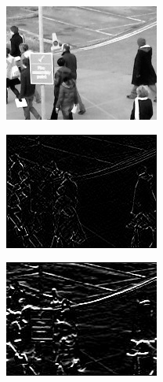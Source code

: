 \documentclass[times, utf8, zavrsni]{fer}
\begin{document}
\begin{multicols}{2}

\begin{minipage}{\linewidth}
\centering
\includegraphics[width=0.8\linewidth]{img/2982.jpg}
\end{minipage}

\begin{minipage}{\linewidth}
\centering
\includegraphics[width=0.8\linewidth]{img/sobel.jpg}
\end{minipage}

\begin{minipage}{\linewidth}
\centering
\includegraphics[width=0.8\linewidth]{img/sobely.jpg}
\end{minipage}


\end{multicols}
\end{document}
